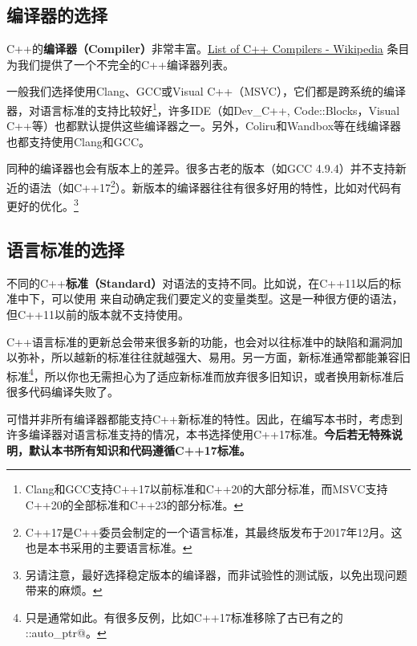 \subsection*{编译器的选择}
C++的\textbf{编译器（Compiler）}非常丰富。\href{https://en.wikipedia.org/wiki/List_of_compilers\#C++_compilers}{List of C++ Compilers - Wikipedia} 条目为我们提供了一个不完全的C++编译器列表。\par
一般我们选择使用Clang、GCC或Visual C++（MSVC），它们都是跨系统的编译器，对语言标准的支持比较好\footnote{Clang和GCC支持C++17以前标准和C++20的大部分标准，而MSVC支持C++20的全部标准和C++23的部分标准。}，许多IDE（如Dev\_C++, Code::Blocks，Visual C++等）也都默认提供这些编译器之一。另外，Coliru和Wandbox等在线编译器也都支持使用Clang和GCC。\par
同种的编译器也会有版本上的差异。很多古老的版本（如GCC 4.9.4）并不支持新近的语法（如C++17\footnote{C++17是C++委员会制定的一个语言标准，其最终版发布于2017年12月。这也是本书采用的主要语言标准。}）。新版本的编译器往往有很多好用的特性，比如对代码有更好的优化。\footnote{另请注意，最好选择稳定版本的编译器，而非试验性的测试版，以免出现问题带来的麻烦。}\par
\subsection*{语言标准的选择}
不同的C++\textbf{标准（Standard）}对语法的支持不同。比如说，在C++11以后的标准中下，可以使用 \lstinline@auto@ 来自动确定我们要定义的变量类型。这是一种很方便的语法，但C++11以前的版本就不支持使用。\par
C++语言标准的更新总会带来很多新的功能，也会对以往标准中的缺陷和漏洞加以弥补，所以越新的标准往往就越强大、易用。另一方面，新标准通常都能兼容旧标准\footnote{只是通常如此。有很多反例，比如C++17标准移除了古已有之的 \lstinline@std::auto_ptr@。}，所以你也无需担心为了适应新标准而放弃很多旧知识，或者换用新标准后很多代码编译失败了。\par
可惜并非所有编译器都能支持C++新标准的特性。因此，在编写本书时，考虑到许多编译器对语言标准支持的情况，本书选择使用C++17标准。\textbf{今后若无特殊说明，默认本书所有知识和代码遵循C++17标准。}\par
